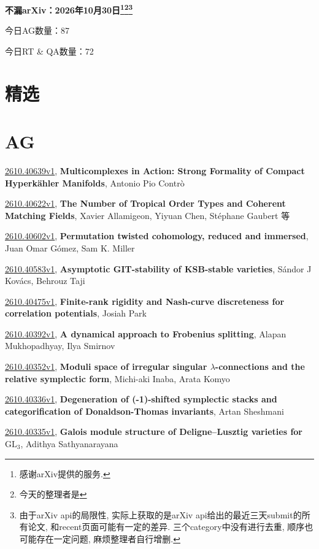 \documentclass[9pt, a4paper]{article}
\theoremstyle{plain}
\theoremstyle{definition}
\theoremstyle{remark}
\newcommand{\arxiv}[3]{\href{https://arxiv.org/abs/#1}{#1}, \textbf{\textcolor{arxivblue}{#2}}, #3}
\newcommand{\AGnumber}{87}
\newcommand{\RTQAnumber}{72}
\newcommand{\NewestDate}{2026年10月30日}
\newcommand{\todayarXiver}{} %
\begin{document}
\begin{center}
    \Huge\textbf{不漏arXiv：\NewestDate\footnote{感谢arXiv提供的服务.}\footnote{今天的整理者是\todayarXiver}\footnote{由于arXiv api的局限性, 实际上获取的是arXiv api给出的最近三天submit的所有论文, 和recent页面可能有一定的差异. 三个category中没有进行去重, 顺序也可能存在一定问题, 麻烦整理者自行增删.}} \\
\end{center}

\setcounter{section}{-1}

\begin{center}
    今日AG数量：\AGnumber
    
    今日RT \& QA数量：\RTQAnumber
    
\end{center}


\section{精选}


\section{AG}
\arxiv{2610.40639v1}{Multicomplexes in Action: Strong Formality of Compact Hyperkähler Manifolds}{Antonio Pio Contrò}

\arxiv{2610.40622v1}{The Number of Tropical Order Types and Coherent Matching Fields}{Xavier Allamigeon, Yiyuan Chen, Stéphane Gaubert 等}

\arxiv{2610.40602v1}{Permutation twisted cohomology, reduced and immersed}{Juan Omar Gómez, Sam K. Miller}

\arxiv{2610.40583v1}{Asymptotic GIT-stability of KSB-stable varieties}{Sándor J Kovács, Behrouz Taji}

\arxiv{2610.40475v1}{Finite-rank rigidity and Nash-curve discreteness for correlation potentials}{Josiah Park}

\arxiv{2610.40392v1}{A dynamical approach to Frobenius splitting}{Alapan Mukhopadhyay, Ilya Smirnov}

\arxiv{2610.40352v1}{Moduli space of irregular singular $λ$-connections and the relative symplectic form}{Michi-aki Inaba, Arata Komyo}

\arxiv{2610.40336v1}{Degeneration of (-1)-shifted symplectic stacks and categorification of Donaldson-Thomas invariants}{Artan Sheshmani}

\arxiv{2610.40335v1}{Galois module structure of Deligne--Lusztig varieties for $\mathrm{GL}_3$}{Adithya Sathyanarayana}
\end{document}
